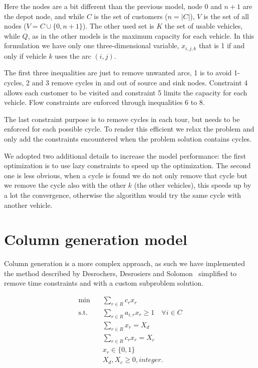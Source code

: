 Here the nodes are a bit different than the previous model, node $0$ and $n+1$ are the depot node, and while $C$ is the set of customers ($n = |C|$), $V$ is the set of all nodes ($V = C \cup \{0, n+1\}$). The other used set is $K$ the set of usable vehicles, while $Q$, as in the other models is the maximum capacity for each vehicle. In this formulation we have only one three-dimensional variable, $x_{i,j,k}$ that is 1 if and only if vehicle $k$ uses the arc $(i,j)$.

The first three inequalities are just to remove unwanted arcs, 1 is to avoid 1-cycles, 2 and 3 remove cycles in and out of source and sink nodes. Constraint 4 allows each customer to be visited and constraint 5 limits the capacity for each vehicle. Flow constraints are enforced through inequalities 6 to 8.

The last constraint purpose is to remove cycles in each tour, but needs to be enforced for each possible cycle. To render this efficient we relax the problem and only add the constraints encountered when the problem solution contains cycles.

We adopted two additional details to increase the model performance: the first optimization is to use lazy constraints to speed up the optimization. The second one is less obvious, when a cycle is found we do not only remove that cycle but we remove the cycle also with the other $k$ (the other vehicles), this speeds up by a lot the convergence, otherwise the algorithm would try the same cycle with another vehicle.

\section{Column generation model}
\label{column-generation-model}

Column generation is a more complex approach, as such we have implemented the method described by Desrochers, Desrosiers and Solomon~\cite{desrochers1992new} simplified to remove time constraints and with a custom subproblem solution.

\begin{align*}
  \min \quad & \sum_{r \in R}{c_rx_r}\\
  \textrm{s.t.} \quad
    &\sum_{r \in R} {a_{i, r}x_r} \geq 1 \quad \forall i \in C \tag{1}\\
    &\sum_{r \in R} {x_r} = X_d \tag{2}\\
    &\sum_{r \in R} {c_rx_r} = X_c \tag{3}\\
    &x_{r} \in \{0,1\} \\
    &X_d, X_c \geq 0, integer.\\
\end{align*}


